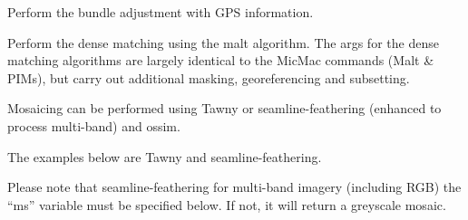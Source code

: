\documentclass[letterpaper,10pt,english]{sphinxmanual}
\begin{document}
Perform the bundle adjustment with GPS information.

\begin{sphinxVerbatim}[commandchars=\\\{\}]
  
                    
\end{sphinxVerbatim}

Perform the dense matching using the malt algorithm. The args for the dense matching algorithms are largely identical to the MicMac commands (Malt \& PIMs), but carry out additional masking, georeferencing and subsetting.

\begin{sphinxVerbatim}[commandchars=\\\{\}]
    
           
\end{sphinxVerbatim}

Mosaicing can be performed using Tawny or seamline-feathering (enhanced to process multi-band) and ossim.

The examples below are Tawny and seamline-feathering.

Please note that seamline-feathering for multi-band imagery (including RGB) the “ms” variable must be specified below. If not, it will return a greyscale mosaic.
\end{document}
